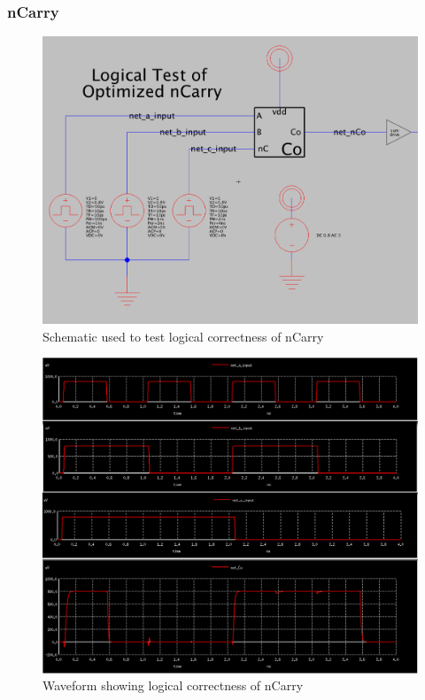 \documentclass{article}
\begin{document}
\subsubsection{nCarry}
\begin{figure}[H]
  \includegraphics[width=\linewidth]{opt_screenshots/test_logic_opt_ncarry_sch.png}
  \caption{Schematic used to test logical correctness of nCarry}
  \label{fig:test_logic_opt_ncarry_sch}
\end{figure}

\begin{figure}[H]
  \includegraphics[width=\linewidth]{opt_screenshots/test_logic_real_ncarry_out.png}
  \caption{Waveform showing logical correctness of nCarry}
  \label{fig:test_logic_real_ncarry_out}
\end{figure}
\end{document}
